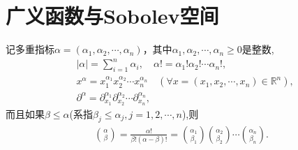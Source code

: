 \documentclass[../main.tex]{subfiles} %
\begin{document}
\chapter{广义函数与Sobolev空间}

\begin{definition}
记多重指标$\alpha=(\alpha_1,\alpha_2,\cdots,\alpha_n)$，其中$\alpha_1,\alpha_2,\cdots,\alpha_n \geqslant 0$是整数,
\begin{align*}
&|\alpha|=\sum\limits_{i=1}^{n}\alpha_i,\quad \alpha!=\alpha_1!\alpha_2!\cdots\alpha_n!,\\
&x^\alpha=x_1^{\alpha_1}x_2^{\alpha_2}\cdots x_n^{\alpha_n}\quad (\forall x=(x_1,x_2,\cdots,x_n)\in\mathbb{R}^n),\\
&\partial^\alpha=\partial_{x_1}^{\alpha_1}\partial_{x_2}^{\alpha_2}\cdots\partial_{x_n}^{\alpha_n},
\end{align*}
而且如果$\beta\leqslant\alpha$(系指$\beta_j\leqslant\alpha_j,j=1,2,\cdots,n$),则
\begin{align*}
\binom{\alpha}{\beta}=\frac{\alpha!}{\beta!(\alpha-\beta)!}=\binom{\alpha_1}{\beta_1}\binom{\alpha_2}{\beta_2}\cdots\binom{\alpha_n}{\beta_n}.
\end{align*}
\end{definition}




















\end{document}
